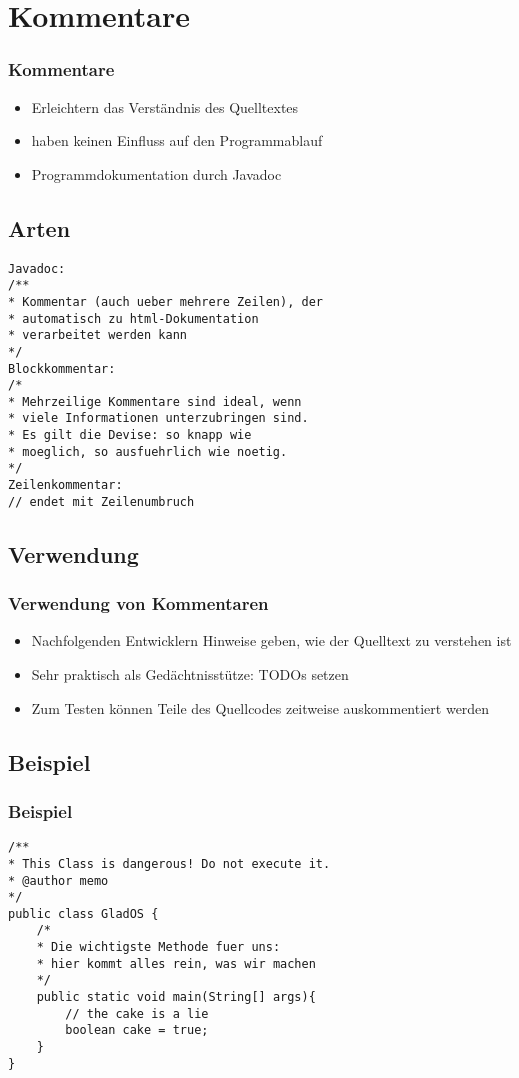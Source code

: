 \documentclass[final]{beamer}
\begin{document}
\section{Kommentare}
\begin{frame}
	\frametitle{Kommentare}
	\begin{itemize}
		\item{Erleichtern das Verständnis des Quelltextes}
		\item{haben keinen Einfluss auf den Programmablauf}
		\item{Programmdokumentation durch Javadoc}
	\end{itemize}
\end{frame}

\subsection{Arten}
\begin{frame}[containsverbatim]
	\begin{lstlisting}
Javadoc:
/**
* Kommentar (auch ueber mehrere Zeilen), der
* automatisch zu html-Dokumentation
* verarbeitet werden kann
*/
Blockkommentar:
/*
* Mehrzeilige Kommentare sind ideal, wenn
* viele Informationen unterzubringen sind.
* Es gilt die Devise: so knapp wie
* moeglich, so ausfuehrlich wie noetig.
*/
Zeilenkommentar:
// endet mit Zeilenumbruch
	\end{lstlisting}
\end{frame}

\subsection{Verwendung}
\begin{frame}
	\frametitle{Verwendung von Kommentaren}
	\begin{itemize}
		\item{Nachfolgenden Entwicklern Hinweise geben, wie der Quelltext zu verstehen ist}
		\item{Sehr praktisch als Gedächtnisstütze: TODOs setzen}
		\item{Zum Testen können Teile des Quellcodes zeitweise auskommentiert werden}
	\end{itemize}
\end{frame}

\subsection{Beispiel}
\begin{frame}[containsverbatim]
\frametitle{Beispiel}
	\begin{lstlisting}
/**
* This Class is dangerous! Do not execute it.
* @author memo
*/
public class GladOS {
	/*
	* Die wichtigste Methode fuer uns: 
	* hier kommt alles rein, was wir machen
	*/
	public static void main(String[] args){
		// the cake is a lie
		boolean cake = true;
	}
}

	\end{lstlisting}
\end{frame}
\end{document}
